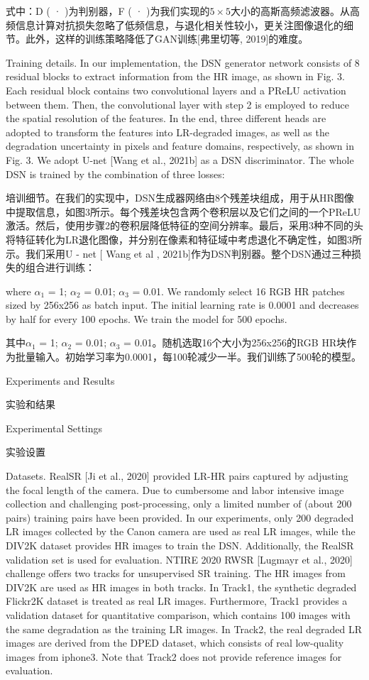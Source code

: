 式中：D ( · )为判别器，F ( · )为我们实现的$5\times5$大小的高斯高频滤波器。从高频信息计算对抗损失忽略了低频信息，与退化相关性较小，更关注图像退化的细节。此外，这样的训练策略降低了GAN训练[弗里切等, 2019]的难度。

Training details. In our implementation, the DSN generator network consists of 8 residual blocks to extract information from the HR image, as shown in Fig. 3. Each residual block contains two convolutional layers and a PReLU activation between them. Then, the convolutional layer with step 2 is employed to reduce the spatial resolution of the features. In the end, three different heads are adopted to transform the features into LR-degraded images, as well as the degradation uncertainty in pixels and feature domains, respectively, as shown in Fig. 3. We adopt U-net [Wang et al., 2021b] as a DSN discriminator. The whole DSN is trained by the combination of three losses:

培训细节。在我们的实现中，DSN生成器网络由8个残差块组成，用于从HR图像中提取信息，如图3所示。每个残差块包含两个卷积层以及它们之间的一个PReLU激活。然后，使用步骤2的卷积层降低特征的空间分辨率。最后，采用3种不同的头将特征转化为LR退化图像，并分别在像素和特征域中考虑退化不确定性，如图3所示。我们采用U - net [ Wang et al , 2021b]作为DSN判别器。整个DSN通过三种损失的组合进行训练：

where $\alpha_1$ = 1; $\alpha_2$ = 0.01; $\alpha_3$ = 0.01. We randomly select 16 RGB HR patches sized by 256x256 as batch input. The initial learning rate is 0.0001 and decreases by half for every 100 epochs. We train the model for 500 epochs.

其中$\alpha_1$ = 1; $\alpha_2$ = 0.01; $\alpha_3$ = 0.01。随机选取16个大小为256x256的RGB HR块作为批量输入。初始学习率为0.0001，每100轮减少一半。我们训练了500轮的模型。





Experiments and Results

实验和结果

Experimental Settings

实验设置

Datasets. RealSR [Ji et al., 2020] provided LR-HR pairs captured by adjusting the focal length of the camera. Due to cumbersome and labor intensive image collection and challenging post-processing, only a limited number of (about 200 pairs) training pairs have been provided. In our experiments, only 200 degraded LR images collected by the Canon camera are used as real LR images, while the DIV2K dataset provides HR images to train the DSN. Additionally, the RealSR validation set is used for evaluation. NTIRE 2020 RWSR [Lugmayr et al., 2020] challenge offers two tracks for unsupervised SR training. The HR images from DIV2K are used as HR images in both tracks. In Track1, the synthetic degraded Flickr2K dataset is treated as real LR images. Furthermore, Track1 provides a validation dataset for quantitative comparison, which contains 100 images with the same degradation as the training LR images. In Track2, the real degraded LR images are derived from the DPED dataset, which consists of real low-quality images from iphone3. Note that Track2 does not provide reference images for evaluation.

